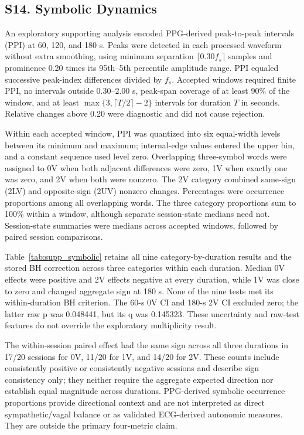 \subsection*{S14. Symbolic Dynamics}
An exploratory supporting analysis encoded PPG-derived peak-to-peak intervals (PPI) at 60, 120, and 180 s. Peaks were detected in each processed waveform without extra smoothing, using minimum separation $\lceil0.30 f_s\rceil$ samples and prominence 0.20 times its 95th--5th percentile amplitude range. PPI equaled successive peak-index differences divided by $f_s$. Accepted windows required finite PPI, no intervals outside 0.30--2.00 s, peak-span coverage of at least 90\% of the window, and at least $\max\{3,\lceil T/2\rceil-2\}$ intervals for duration $T$ in seconds. Relative changes above 0.20 were diagnostic and did not cause rejection.

Within each accepted window, PPI was quantized into six equal-width levels between its minimum and maximum; internal-edge values entered the upper bin, and a constant sequence used level zero. Overlapping three-symbol words were assigned to 0V when both adjacent differences were zero, 1V when exactly one was zero, and 2V when both were nonzero. The 2V category combined same-sign (2LV) and opposite-sign (2UV) nonzero changes. Percentages were occurrence proportions among all overlapping words. The three category proportions sum to 100\% within a window, although separate session-state medians need not. Session-state summaries were medians across accepted windows, followed by paired session comparisons.

Table~\ref{tab:supp_symbolic} retains all nine category-by-duration results and the stored BH correction across three categories within each duration. Median 0V effects were positive and 2V effects negative at every duration, while 1V was close to zero and changed aggregate sign at 180 s. None of the nine tests met its within-duration BH criterion. The 60-s 0V CI and 180-s 2V CI excluded zero; the latter raw p was 0.048441, but its q was 0.145323. These uncertainty and raw-test features do not override the exploratory multiplicity result.

The within-session paired effect had the same sign across all three durations in 17/20 sessions for 0V, 11/20 for 1V, and 14/20 for 2V. These counts include consistently positive or consistently negative sessions and describe sign consistency only; they neither require the aggregate expected direction nor establish equal magnitude across durations. PPG-derived symbolic occurrence proportions provide directional context and are not interpreted as direct sympathetic/vagal balance or as validated ECG-derived autonomic measures. They are outside the primary four-metric claim.

